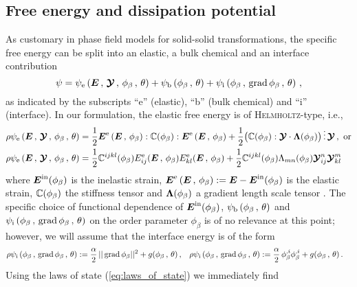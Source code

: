 \documentclass[preprint,review,3p,times,authoryear]{elsarticle}
\begin{document}
\subsection{Free energy and dissipation potential}
\label{sec:free-energy-dissipation-pot}
As customary in phase field models for solid-solid transformations, the specific free energy can be split into an elastic, a bulk chemical and an interface contribution
\begin{equation}
  \psi = \psi_{\text{e}}\left( \boldsymbol{E}\,,\,\boldsymbol{\mathcal{Y}}\,,\,\phi_{\beta}\,,\,\theta \right) + \psi_{\text{b}}\left( \phi_{\beta}\,,\, \theta \right) + \psi_{\text{i}}\left( \phi_{\beta}\,,\, \operatorname*{grad}\phi_{\beta}\,,\, \theta \right)\,,
\end{equation}
as indicated by the subscripts ``e'' (elastic), ``b'' (bulk chemical) and ``i'' (interface). In our formulation, the elastic free energy is of \textsc{Helmholtz}-type, i.e.,
\begin{align}
  \label{eq:helmholtz_type}
  &\rho\psi_{\text{e}}\left( \boldsymbol{E}\,,\,\boldsymbol{\mathcal{Y}}\,,\,\phi_{\beta}\,,\,\theta \right) =
  \frac{1}{2} \boldsymbol{E}^{\text{e}}\left(\boldsymbol{E}\,,\,\phi_{\beta}\right) : \mathbb{C}(\phi_{\beta}) : \boldsymbol{E}^{\text{e}}\left(\boldsymbol{E}\,,\,\phi_{\beta}\right)
  + \frac{1}{2} \bigl( \mathbb{C}(\phi_{\beta}):\boldsymbol{\mathcal{Y}}\cdot\boldsymbol{\Lambda{}}(\phi_{\beta}) \bigr) \,\smash\vdots\, \boldsymbol{\mathcal{Y}}\,,\text{ or}\\
  &\rho\psi_{\text{e}}\left( \boldsymbol{E}\,,\,\boldsymbol{\mathcal{Y}}\,,\,\phi_{\beta}\,,\,\theta \right) =
    \frac{1}{2} \mathbb{C}^{ijkl}(\phi_{\beta}) E_{ij}^{\text{e}}(\boldsymbol{E}\,,\,\phi_{\beta})E_{kl}^{\text{e}}(\boldsymbol{E}\,,\,\phi_{\beta})
  + \frac{1}{2} \mathbb{C}^{ijkl}(\phi_{\beta})\Lambda_{mn}(\phi_{\beta}) \boldsymbol{\mathcal{Y}}_{ij}^{n}\boldsymbol{\mathcal{Y}}_{kl}^{m}\,
\end{align}
where $\boldsymbol{E}^{\text{in}}(\phi_{\beta})$ is the inelastic strain, $\boldsymbol{E}^{\text{e}}\left(\boldsymbol{E}\,,\,\phi_{\beta}\right):=\boldsymbol{E} - \boldsymbol{E}^{\text{in}}(\phi_{\beta})$ is the elastic strain, $\mathbb{C}(\phi_{\beta})$ the stiffness tensor and $\boldsymbol{\Lambda{}}(\phi_{\beta})$ a gradient length scale tensor \citep[cf.][]{Po:2018}. The specific choice of functional dependence of $\boldsymbol{E}^{\text{in}}(\phi_{\beta})$, $\psi_{\text{b}}\left( \phi_{\beta}\,,\, \theta \right)$ and  $\psi_{\text{i}}\left( \phi_{\beta}\,,\, \operatorname*{grad}\phi_{\beta}\,,\, \theta \right)$ on the order parameter $\phi_{\beta}$ is of no relevance at this point; however, we will assume that the interface energy is of the form
\begin{align}
  \label{eq:interface_en_dens}
  &\rho\psi_{\text{i}}\left( \phi_{\beta}\,,\, \operatorname*{grad}\phi_{\beta}\,,\, \theta \right) := \frac{\alpha}{2}\, || \operatorname*{grad}\phi_{\beta} ||^{2} + g(\phi_{\beta}\,,\,\theta)\,,
    && \rho\psi_{\text{i}}\left( \phi_{\beta}\,,\, \operatorname*{grad}\phi_{\beta}\,,\, \theta \right) := \frac{\alpha}{2}\, \phi_{\beta}^{,i}\phi_{\beta}^{,i} + g(\phi_{\beta}\,,\,\theta)\,.
\end{align}
Using the laws of state (\ref{eq:laws_of_state}) we immediately find
\end{document}
